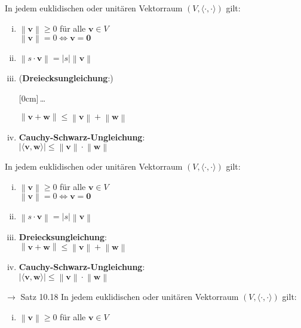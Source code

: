 \documentclass[11pt]{article}
\renewcommand{\cite}[1]{\par\bigskip\hfill{\color{gray}\tiny\(\to\) #1}}
\newcommand*{\abs}[1]{\left\vert#1\right\vert}
\newcommand*{\norm}[1]{\left\|#1\right\|}
\newcommand*{\scprod}[2]{\langle #1, #2\rangle} %
\renewcommand{\leq}{\leqslant}
\renewcommand{\geq}{\geqslant}
\renewcommand{\vec}[1]{\mathbf{#1}}
\newcommand{\hide}[1]{\parbox{0cm}{\raisebox{-7pt}[0cm]{\dots}}\color{white}#1\color{black}}
\newcommand{\hint}[1]{{\color{lightgray}(#1)}}
\let\olddots\dots
\renewcommand{\dots}{\,\olddots\,}
\newenvironment{field}{}{\newpage}
\newif\ifnote
\newenvironment{note}{\notetrue}{\notefalse}
\begin{document}
\begin{note}
    \begin{field}
        In jedem euklidischen oder unitären Vektorraum \((V, \scprod{\cdot}{\cdot})\) gilt:
        \begin{enumerate}[(i)]
            \item \(\norm{\vec{v}} \geq 0\) für alle \(\vec{v}\in V\) \\
                  \(\norm{\vec{v}} = 0 \Leftrightarrow \vec{v} = \vec{0}\)
            \item \(\norm{s\cdot\vec{v}} = \abs{s}\norm{\vec{v}}\)
            \item \hint{\textbf{Dreiecksungleichung}:}\\
                  \hide{\(\norm{\vec{v}+ \vec{w}} \leq \norm{\vec{v}} + \norm{\vec{w}}\)}
            \item \textbf{Cauchy-Schwarz-Ungleichung}:\\
                  \(\abs{\scprod{\vec{v}}{\vec{w}}} \leq \norm{\vec{v}}\cdot\norm{\vec{w}}\)
        \end{enumerate}
    \end{field}
    \begin{field}
        In jedem euklidischen oder unitären Vektorraum \((V, \scprod{\cdot}{\cdot})\) gilt:
        \begin{enumerate}[(i)]
            \item \(\norm{\vec{v}} \geq 0\) für alle \(\vec{v}\in V\) \\
                  \(\norm{\vec{v}} = 0 \Leftrightarrow \vec{v} = \vec{0}\)
            \item \(\norm{s\cdot\vec{v}} = \abs{s}\norm{\vec{v}}\)
            \item \textbf{Dreiecksungleichung}:\\
                  \(\norm{\vec{v}+ \vec{w}} \leq \norm{\vec{v}} + \norm{\vec{w}}\)
            \item \textbf{Cauchy-Schwarz-Ungleichung}:\\
                  \(\abs{\scprod{\vec{v}}{\vec{w}}} \leq \norm{\vec{v}}\cdot\norm{\vec{w}}\)
        \end{enumerate}
        \cite{Satz 10.18}
    \end{field}
    \begin{field}
        In jedem euklidischen oder unitären Vektorraum \((V, \scprod{\cdot}{\cdot})\) gilt:
        \begin{enumerate}[(i)]
            \item \(\norm{\vec{v}} \geq 0\) für alle \(\vec{v}\in V\) \\

\end{enumerate}
\end{field}
\end{note}
\end{document}
